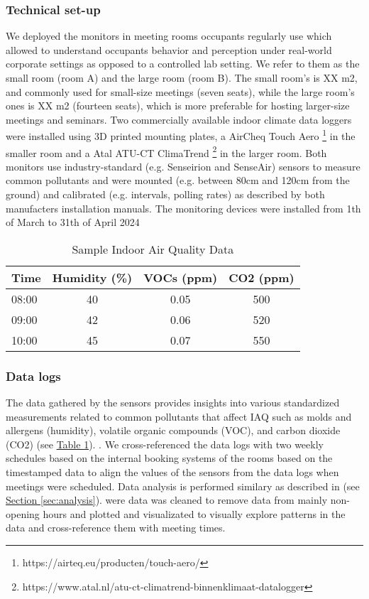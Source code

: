 \subsubsection{Technical set-up}

We deployed the monitors in meeting rooms occupants regularly use which allowed to understand occupants behavior and perception under real-world corporate settings as opposed to a controlled lab setting. We refer to them as the small room (room A) and the large room (room B). The small room’s is XX m2, and commonly used for small-size meetings (seven seats), while the large room’s ones is XX m2 (fourteen seats), which is more preferable for hosting larger-size meetings and seminars. Two commercially available indoor climate data loggers were installed using 3D printed mounting plates, a AirCheq Touch Aero \footnote{https://airteq.eu/producten/touch-aero/} in the smaller room and a Atal ATU-CT ClimaTrend \footnote{https://www.atal.nl/atu-ct-climatrend-binnenklimaat-datalogger} in the larger room. Both monitors use industry-standard (e.g. Senseirion and SenseAir) sensors to measure common pollutants and were mounted (e.g. between 80cm and 120cm from the ground) and calibrated (e.g. intervals, polling rates) as described by both manufacters installation manuals. The monitoring devices were installed from 1th of March to 31th of April 2024

\begin{table}[htbp]
    \centering
    \caption{Sample Indoor Air Quality Data}
    \begin{tabular}{lccc}
        \toprule
        \textbf{Time} & \textbf{Humidity (\%)} & \textbf{VOCs (ppm)} & \textbf{CO2 (ppm)} \\
        \midrule
        08:00 & 40 & 0.05 & 500 \\
        09:00 & 42 & 0.06 & 520 \\
        10:00 & 45 & 0.07 & 550 \\
        \bottomrule
    \end{tabular}
    \label{tab:air-quality}
\end{table}

\subsubsection{Data logs}

The data gathered by the sensors provides insights into various standardized measurements related to common pollutants that affect IAQ such as molds and allergens (humidity), volatile organic compounds (VOC), and carbon dioxide (CO2) (see \hyperref[tab:air-quality]{Table \ref*{tab:air-quality}}).
. We cross-referenced the data logs with two weekly schedules based on the internal booking systems of the rooms based on the timestamped data to align the values of the sensors from the data logs when meetings were scheduled.
Data analysis is performed similary as described in (see \hyperref[sec:analysis]{Section \ref*{sec:analysis}}). were data was cleaned to remove data from mainly non-opening hours and plotted and visualizated to visually explore patterns in the data and cross-reference them with meeting times.


